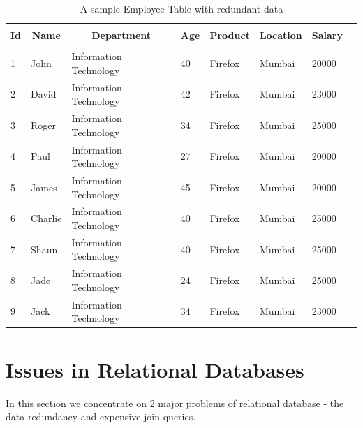\documentclass[12pt, oneside]{book}
\begin{document}
\begin{table}[h]
\begin{center}
    \begin{tabular}{| m{} | m{} | m{} | m{} | m{} | m{} | m{} | @{}m{0pt}@{}}
    \hline
    \multicolumn{1}{|c|}{} & \multicolumn{1}{c|}{} & \multicolumn{1}{c|}{} & \multicolumn{1}{c|}{} & \multicolumn{1}{c|}{} & \multicolumn{1}{c|}{} & \multicolumn{1}{c|}{} &  \\
    \multicolumn{1}{|c|}{\textbf{Id}} & \multicolumn{1}{c|}{\textbf{Name}} & \multicolumn{1}{c|}{\textbf{Department}} & \multicolumn{1}{c|}{\textbf{Age}} & \multicolumn{1}{c|}{\textbf{Product}} & \multicolumn{1}{c|}{\textbf{Location}} & \multicolumn{1}{c|}{\textbf{Salary}} & \\
    \multicolumn{1}{|c|}{} & \multicolumn{1}{c|}{} & \multicolumn{1}{c|}{} & \multicolumn{1}{c|}{} & \multicolumn{1}{c|}{} & \multicolumn{1}{c|}{} & \multicolumn{1}{c|}{} &  \\
    \hline
    1 & John & Information Technology & 40 & Firefox & Mumbai & 20000 & \\ [1ex] \hline
    2 & David & Information Technology & 42 & Firefox & Mumbai & 23000 & \\ [1ex] \hline
    3 & Roger & Information Technology & 34 & Firefox & Mumbai & 25000 & \\ [1ex] \hline
    4 & Paul & Information Technology & 27 & Firefox & Mumbai & 20000 & \\ [1ex] \hline
    5 & James & Information Technology & 45 & Firefox & Mumbai & 20000 & \\ [1ex] \hline
    6 & Charlie & Information Technology & 40 & Firefox & Mumbai & 25000 & \\ [1ex] \hline
    7 & Shaun & Information Technology & 40 & Firefox & Mumbai & 25000 & \\ [1ex] \hline
    8 & Jade & Information Technology & 24 & Firefox & Mumbai & 25000 & \\ [1ex] \hline
    9 & Jack & Information Technology & 34 & Firefox & Mumbai & 23000 & \\ [1ex] \hline
    \end{tabular}
\end{center}
    \caption{A sample Employee Table with redundant data}
    \label{tab:employee_demo}
\end{table}
\section{Issues in Relational Databases}
\label{sec:issues}
In this section we concentrate on 2 major problems of relational database - the data redundancy and expensive join queries.
\end{document}
